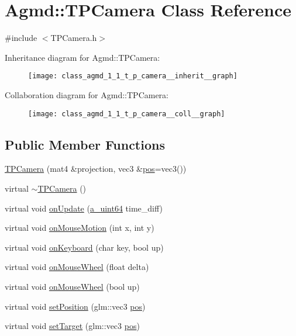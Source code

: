 \hypertarget{class_agmd_1_1_t_p_camera}{\section{Agmd\+:\+:T\+P\+Camera Class Reference}
\label{class_agmd_1_1_t_p_camera}
}


{\ttfamily \#include $<$T\+P\+Camera.\+h$>$}



Inheritance diagram for Agmd\+:\+:T\+P\+Camera\+:\nopagebreak
\begin{figure}[H]
\begin{center}
\leavevmode
\texttt{[image: class\_agmd\_1\_1\_t\_p\_camera\_\_inherit\_\_graph]}
\end{center}
\end{figure}


Collaboration diagram for Agmd\+:\+:T\+P\+Camera\+:\nopagebreak
\begin{figure}[H]
\begin{center}
\leavevmode
\texttt{[image: class\_agmd\_1\_1\_t\_p\_camera\_\_coll\_\_graph]}
\end{center}
\end{figure}
\subsection*{Public Member Functions}
\begin{DoxyCompactItemize}
\item 
\hyperlink{class_agmd_1_1_t_p_camera_afc44937f2240183b40e1bfdd8a3f29fb}{T\+P\+Camera} (mat4 \&projection, vec3 \&\hyperlink{_examples_2_planet_2_app_8cpp_aa8a1c0491559faca4ebd0881575ae7f0}{pos}=vec3())
\item 
virtual \hyperlink{class_agmd_1_1_t_p_camera_ae465cca4c7a92bc6b4ba05aa4d04c050}{$\sim$\+T\+P\+Camera} ()
\item 
virtual void \hyperlink{class_agmd_1_1_t_p_camera_a4cd0db75011e1f173d0ba8849915c8a7}{on\+Update} (\hyperlink{_common_defines_8h_a6c5192ec3c55d6e5b13d2dbaa082bdea}{a\+\_\+uint64} time\+\_\+diff)
\item 
virtual void \hyperlink{class_agmd_1_1_t_p_camera_a1810fd8f0d0a54d6139d57fa4d8582e3}{on\+Mouse\+Motion} (int x, int y)
\item 
virtual void \hyperlink{class_agmd_1_1_t_p_camera_a8f42a9f4193e6638b827c2bc499530c0}{on\+Keyboard} (char key, bool up)
\item 
virtual void \hyperlink{class_agmd_1_1_t_p_camera_a7de48e08f381f1360cb7f5d868fffb9b}{on\+Mouse\+Wheel} (float delta)
\item 
virtual void \hyperlink{class_agmd_1_1_t_p_camera_aab0a8d73857d92c72491f7b8bac21998}{on\+Mouse\+Wheel} (bool up)
\item 
virtual void \hyperlink{class_agmd_1_1_t_p_camera_a74f9fc32896db29d618cf34c8b71d315}{set\+Position} (glm\+::vec3 \hyperlink{_examples_2_planet_2_app_8cpp_aa8a1c0491559faca4ebd0881575ae7f0}{pos})
\item 
virtual void \hyperlink{class_agmd_1_1_t_p_camera_ae2454e8823d2821f25c2a679dc0750f5}{set\+Target} (glm\+::vec3 \hyperlink{_examples_2_planet_2_app_8cpp_aa8a1c0491559faca4ebd0881575ae7f0}{pos})
\end{DoxyCompactItemize}
